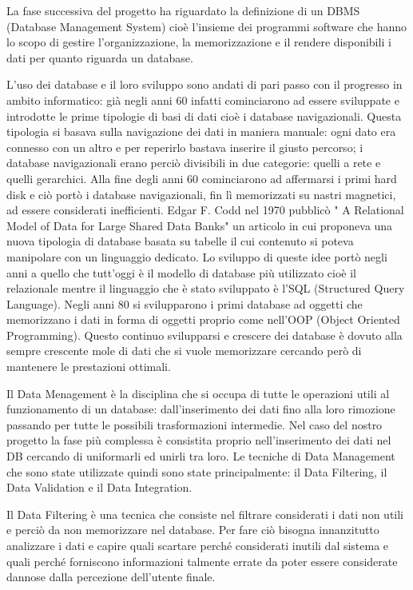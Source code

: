 \documentclass[12pt]{report}
\begin{document}
La fase successiva del progetto ha riguardato la definizione di un DBMS (Database Management System) cioè l'insieme dei programmi software che hanno lo scopo di gestire l'organizzazione, la memorizzazione e il rendere disponibili i dati per quanto riguarda un database.

L'uso dei database e il loro sviluppo sono andati di pari passo con il progresso in ambito informatico: già negli anni 60 infatti cominciarono ad essere sviluppate e introdotte le prime tipologie di basi di dati cioè i database navigazionali. 
Questa tipologia si basava sulla navigazione dei dati in maniera manuale: ogni dato era connesso con un altro e per reperirlo bastava inserire il giusto percorso; i database navigazionali erano perciò divisibili in due categorie: quelli a rete e quelli gerarchici.
Alla fine degli anni 60 cominciarono ad affermarsi i primi hard disk e ciò portò i database navigazionali, fin lì memorizzati su nastri magnetici, ad essere considerati inefficienti. 
Edgar F. Codd nel 1970 pubblicò " A Relational Model of Data for Large Shared Data Banks" un articolo in cui proponeva una nuova tipologia di database basata su tabelle il cui contenuto si poteva manipolare con un linguaggio dedicato.
Lo sviluppo di queste idee portò negli anni a quello che tutt'oggi è il modello di database più utilizzato cioè il relazionale mentre il linguaggio che è stato sviluppato è l'SQL (Structured Query Language).
Negli anni 80 si svilupparono i primi database ad oggetti che memorizzano i dati in forma di oggetti proprio come nell'OOP (Object Oriented Programming).
Questo continuo svilupparsi e crescere dei database è dovuto alla sempre crescente mole di dati che si vuole memorizzare cercando però di mantenere le prestazioni ottimali. 

Il Data Menagement è la disciplina che si occupa di tutte le operazioni utili al funzionamento di un database: dall'inserimento dei dati fino alla loro rimozione passando per tutte le possibili trasformazioni intermedie.
Nel caso del nostro progetto la fase più complessa è consistita proprio nell'inserimento dei dati nel DB cercando di uniformarli ed unirli tra loro. 
Le tecniche di Data Management che sono state utilizzate quindi sono state principalmente: il Data Filtering, il Data Validation e il Data Integration.

Il Data Filtering è una tecnica che consiste nel filtrare considerati i dati non utili e perciò da non memorizzare nel database.
Per fare ciò bisogna innanzitutto analizzare i dati e capire quali scartare perché considerati inutili dal sistema e quali perché forniscono informazioni talmente errate da poter essere considerate dannose dalla percezione dell'utente finale.
\end{document}

